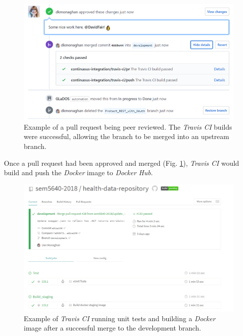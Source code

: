 \begin{figure}[H]
    \centering
    \includegraphics[width=\textwidth]{Images/approve_pr.png}
    \caption{Example of a pull request being peer reviewed. The \textit{Travis CI} builds were successful, allowing the branch to be merged into an upstream branch.}
    \label{fig:approve_pull_request}
\end{figure}

Once a pull request had been approved and merged (Fig. \ref{fig:approve_pull_request}), \textit{Travis CI} would build and push the \textit{Docker} image to \textit{Docker Hub}.

\begin{figure}[H]
    \centering
    \includegraphics[width=\textwidth]{Images/travis_builds_overview.png}
    \caption{Example of \textit{Travis CI} running unit tests and building a \textit{Docker} image after a successful merge to the development branch.}
    \label{fig:travis_ui}
\end{figure}

